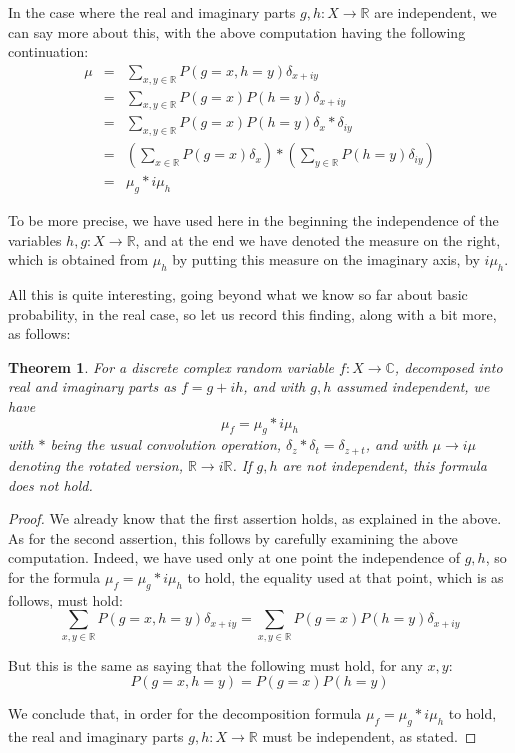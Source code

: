 \documentclass[12pt]{amsbook}
\newtheorem{theorem}{Theorem}[chapter]
\begin{document}
In the case where the real and imaginary parts $g,h:X\to\mathbb R$ are independent, we can say more about this, with the above computation having the following continuation:
\begin{eqnarray*}
\mu
&=&\sum_{x,y\in\mathbb R}P(g=x,h=y)\delta_{x+iy}\\
&=&\sum_{x,y\in\mathbb R}P(g=x)P(h=y)\delta_{x+iy}\\
&=&\sum_{x,y\in\mathbb R}P(g=x)P(h=y)\delta_x*\delta_{iy}\\
&=&\left(\sum_{x\in\mathbb R}P(g=x)\delta_x\right)*\left(\sum_{y\in\mathbb R}P(h=y)\delta_{iy}\right)\\
&=&\mu_g*i\mu_h
\end{eqnarray*}

To be more precise, we have used here in the beginning the independence of the variables $h,g:X\to\mathbb R$, and at the end we have denoted the measure on the right, which is obtained from $\mu_h$ by putting this measure on the imaginary axis, by $i\mu_h$.

\bigskip

All this is quite interesting, going beyond what we know so far about basic probability, in the real case, so let us record this finding, along with a bit more, as follows:

\begin{theorem}
For a discrete complex random variable $f:X\to\mathbb C$, decomposed into real and imaginary parts as $f=g+ih$, and with $g,h$ assumed independent, we have
$$\mu_f=\mu_g*i\mu_h$$
with $*$ being the usual convolution operation, $\delta_z*\delta_t=\delta_{z+t}$, and with $\mu\to i\mu$ denoting the rotated version, $\mathbb R\to i\mathbb R$. If $g,h$ are not independent, this formula does not hold.
\end{theorem}

\begin{proof}
We already know that the first assertion holds, as explained in the above. As for the second assertion, this follows by carefully examining the above computation. Indeed, we have used only at one point the independence of $g,h$, so for the formula $\mu_f=\mu_g*i\mu_h$ to hold, the equality used at that point, which is as follows, must hold:
$$\sum_{x,y\in\mathbb R}P(g=x,h=y)\delta_{x+iy}
=\sum_{x,y\in\mathbb R}P(g=x)P(h=y)\delta_{x+iy}$$

But this is the same as saying that the following must hold, for any $x,y$:
$$P(g=x,h=y)=P(g=x)P(h=y)$$

We conclude that, in order for the decomposition formula $\mu_f=\mu_g*i\mu_h$ to hold, the real and imaginary parts $g,h:X\to\mathbb R$ must be independent, as stated.
\end{proof}
\end{document}
